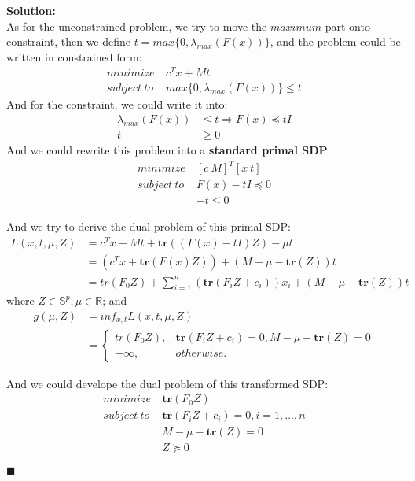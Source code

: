 \documentclass{article}
\newenvironment{solution}                               %
{\textbf{Solution:} \\}{$\blacksquare$\newline}         %
\newcommand{\leadto}{\Rightarrow}                       %
\newcommand{\domR}{\mathbb{R}}                          %
\newcommand{\domS}{\mathbb{S}}                          %
\newcommand{\tr}[1]{\textbf{tr}(#1)}                    %
\begin{document}
\begin{solution}
    As for the unconstrained problem, we try to move the $\textit{maximum}$ part onto constraint, then we define $t = max\{0, \lambda_{max}(F(x))\}$, and the problem could be written in constrained form:
    \begin{align*}
        minimize\ &c^T x + Mt \\
        subject\ to\ & max\{0, \lambda_{max}(F(x))\} \leq t
    \end{align*}
    And for the constraint, we could write it into:
    \begin{align*}
        \lambda_{max}(F(x)) &\leq t
            \leadto F(x) \preceq tI \\
        t &\geq 0
    \end{align*}
    And we could rewrite this problem into a \textbf{standard primal SDP}:
    \begin{align*}
        minimize\ &[c\ M]^T [x\ t] \\
        subject\ to\ 
            & F(x) - tI \preceq 0 \\
            & -t \leq 0
    \end{align*}

    And we try to derive the dual problem of this primal SDP:
    \begin{align*}
        L(x, t, \mu, Z) &= c^T x + Mt + \tr{(F(x)-tI)Z} - \mu t \\
        &= (c^T x + \tr{F(x)Z}) + (M - \mu - \tr{Z})t \\
        &= tr(F_0 Z) + \sum_{i=1}^{n} (\tr{F_i Z + c_i})x_i + (M - \mu - \tr{Z})t
    \end{align*}
    where $Z \in \domS^p, \mu \in \domR$; and
    \begin{align*}
        g(\mu, Z) &= inf_{x, t} L(x, t, \mu, Z) \\
        &= 
        \begin{cases}
            tr(F_0 Z), & \tr{F_i Z + c_i} = 0, M - \mu - \tr{Z} = 0 \\
            -\infty, & otherwise.
        \end{cases}
    \end{align*}

    And we could develope the dual problem of this transformed SDP:
    \begin{align*}
        minimize\ &\tr{F_0 Z} \\
        subject\ to\ 
            & \tr{F_i Z + c_i} = 0, i = 1, \dots, n \\
            & M - \mu - \tr{Z} = 0 \\
            & Z \succeq 0
    \end{align*}


\end{solution}
\end{document}
